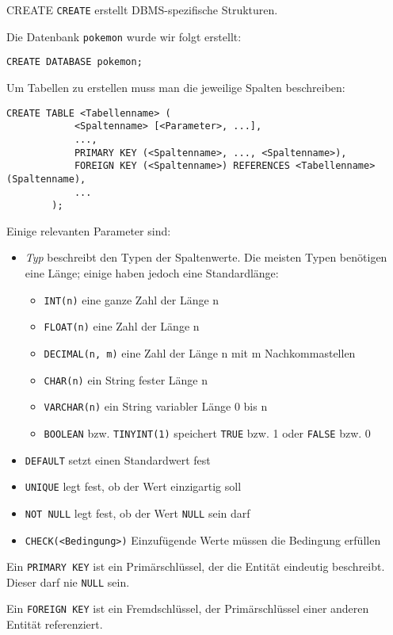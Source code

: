 \begin{sql}{CREATE}
    \texttt{CREATE} erstellt DBMS-spezifische Strukturen.

    Die Datenbank \texttt{pokemon} wurde wir folgt erstellt:

    \begin{lstlisting}[language=mysql]
        CREATE DATABASE pokemon;
    \end{lstlisting}

    Um Tabellen zu erstellen muss man die jeweilige Spalten beschreiben:

    \begin{lstlisting}[language=mysql]
        CREATE TABLE <Tabellenname> (
            <Spaltenname> [<Parameter>, ...],
            ...,
            PRIMARY KEY (<Spaltenname>, ..., <Spaltenname>),
            FOREIGN KEY (<Spaltenname>) REFERENCES <Tabellenname> (Spaltenname),
            ...
        );
    \end{lstlisting}

    Einige relevanten Parameter sind:

    \begin{itemize}
        \item \emph{Typ} beschreibt den Typen der Spaltenwerte.
              Die meisten Typen benötigen eine Länge; einige haben jedoch eine Standardlänge:

              \begin{itemize}
                  \item \texttt{INT(n)} eine ganze Zahl der Länge n
                  \item \texttt{FLOAT(n)} eine Zahl der Länge n
                  \item \texttt{DECIMAL(n, m)} eine Zahl der Länge n mit m Nachkommastellen
                  \item \texttt{CHAR(n)} ein String fester Länge n
                  \item \texttt{VARCHAR(n)} ein String variabler Länge 0 bis n
                  \item \texttt{BOOLEAN} bzw. \texttt{TINYINT(1)} speichert \texttt{TRUE} bzw. 1 oder \texttt{FALSE} bzw. 0
              \end{itemize}
        \item \texttt{DEFAULT} setzt einen Standardwert fest
        \item \texttt{UNIQUE} legt fest, ob der Wert einzigartig soll
        \item \texttt{NOT NULL} legt fest, ob der Wert \texttt{NULL} sein darf
        \item \texttt{CHECK(<Bedingung>)} Einzufügende Werte müssen die Bedingung erfüllen
    \end{itemize}

    Ein \texttt{PRIMARY KEY} ist ein Primärschlüssel, der die Entität eindeutig beschreibt.
    Dieser darf nie \texttt{NULL} sein.

    Ein \texttt{FOREIGN KEY} ist ein Fremdschlüssel, der Primärschlüssel einer anderen Entität referenziert.
\end{sql}

